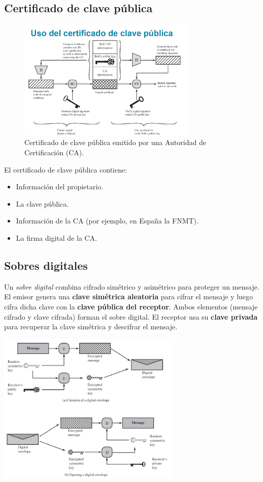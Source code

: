 \documentclass[11pt,a4paper]{article}
\begin{document}
\subsection{Certificado de clave pública}
\begin{figure}[h!]
    \centering
    \includegraphics[width=0.75\textwidth]{resources/PublicKey_CA.png}
    \caption{Certificado de clave pública emitido por una Autoridad de Certificación (CA).}
\end{figure}

El certificado de clave pública contiene:
\begin{itemize}
    \item Información del propietario.
    \item La clave pública.
    \item Información de la CA (por ejemplo, en España la FNMT).
    \item La firma digital de la CA.
\end{itemize}

\subsection{Sobres digitales}

Un \emph{sobre digital} combina cifrado simétrico y asimétrico para proteger un mensaje.
El emisor genera una \textbf{clave simétrica aleatoria} para cifrar el mensaje y luego cifra dicha clave con la \textbf{clave pública del receptor}.
Ambos elementos (mensaje cifrado y clave cifrada) forman el sobre digital.
El receptor usa su \textbf{clave privada} para recuperar la clave simétrica y descifrar el mensaje.

\begin{center}
    \includegraphics[width=0.65\textwidth]{resources/DigitalEnvelopes.png}
\end{center}
\end{document}
